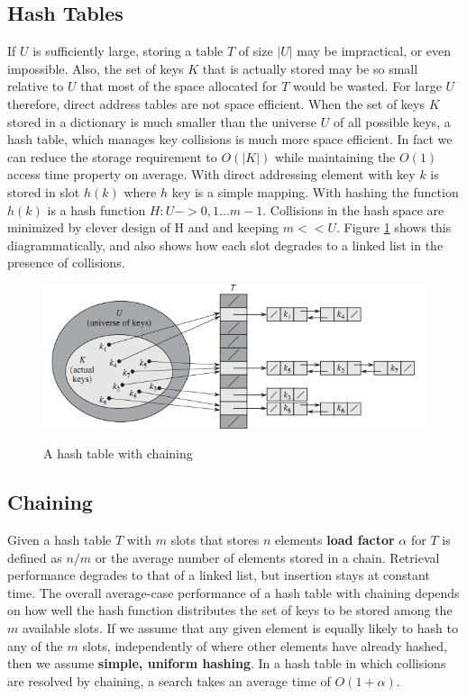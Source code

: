 \documentclass[10pt,a4paper]{article}
\begin{document}
\subsection{Hash Tables}
If $U$ is sufficiently large, storing a table $T$ of size $|U|$ may be impractical, or even impossible. Also, the set of keys $K$ that is actually stored may be so small relative to $U$ that most of the space allocated for $T$ would be wasted. For large $U$ therefore, direct address tables are not space efficient. When the set of keys $K$ stored in a dictionary is much smaller than the universe $U$ of all possible keys, a hash table, which manages key collisions is much more space efficient. In fact we can reduce the storage requirement to $O(|K|)$ while maintaining the $O(1)$ access time property on average. With direct addressing element with key $k$ is stored in slot $h(k)$ where $h$ key is a simple mapping. With hashing the function $h(k)$ is a hash function $H : U -> {0,1...m-1}$. Collisions in the hash space are minimized by clever design of H and and keeping $m << U$. Figure \ref{hashtable} shows this diagrammatically, and also shows how each slot degrades to a linked list in the presence of collisions. 
\begin{figure}
\caption{A hash table with chaining \cite{INTROALG}}
\begin{center}
\includegraphics[scale=0.43]{../images/hashtable.png}
\label{hashtable}
\end{center}
\end{figure}
\subsection{Chaining}
Given a hash table $T$ with $m$ slots that stores $n$ elements {\bf load factor}  $\alpha$  for $T$ is defined as $n/m$ or the average number of elements stored in a chain. Retrieval performance degrades to that of a linked list, but insertion stays at constant time. The overall average-case performance of a hash table with chaining depends on how well the hash function distributes the set of keys to be stored among the $m$ available slots. If we assume that any given element is equally likely to hash to any of the $m$ slots, independently of where other elements have already hashed, then we assume {\bf simple, uniform hashing}. In a hash table in which collisions are resolved by chaining, a search takes an average time of  $O(1+\alpha)$.
\end{document}
